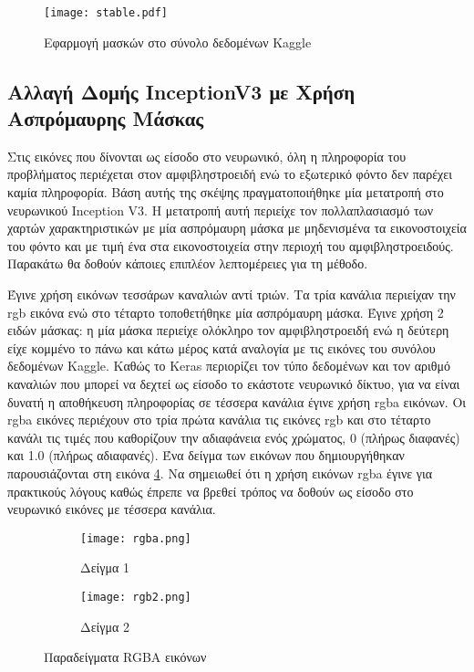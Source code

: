 \begin{figure}[!h]
    \centering
      \texttt{[image: stable.pdf]} \caption{Εφαρμογή μασκών στο σύνολο δεδομένων Kaggle}
\label{figure:stable}  
\end{figure}

\subsection{Αλλαγή Δομής InceptionV3 με Χρήση Ασπρόμαυρης Μάσκας}
\label{subsec:5.4.5}

Στις εικόνες που δίνονται ως είσοδο στο νευρωνικό, όλη η πληροφορία του προβλήματος περιέχεται στον αμφιβληστροειδή ενώ το εξωτερικό φόντο δεν παρέχει καμία πληροφορία. Βάση αυτής της σκέψης πραγματοποιήθηκε μία μετατροπή στο νευρωνικού Inception V3. Η μετατροπή αυτή περιείχε  τον πολλαπλασιασμό των χαρτών χαρακτηριστικών με μία ασπρόμαυρη μάσκα με μηδενισμένα τα εικονοστοιχεία του φόντο και με τιμή ένα στα εικονοστοιχεία στην περιοχή του αμφιβληστροειδούς. Παρακάτω θα δοθούν κάποιες επιπλέον λεπτομέρειες για τη μέθοδο.

Έγινε χρήση εικόνων τεσσάρων καναλιών αντί τριών. Τα τρία  κανάλια περιείχαν την rgb εικόνα ενώ στο τέταρτο τοποθετήθηκε μία ασπρόμαυρη μάσκα. Έγινε χρήση 2 ειδών μάσκας: η μία μάσκα περιείχε ολόκληρο τον αμφιβληστροειδή ενώ η δεύτερη είχε κομμένο το πάνω και κάτω μέρος κατά αναλογία με τις εικόνες του συνόλου δεδομένων Kaggle.  Καθώς το Keras περιορίζει τον τύπο δεδομένων και τον αριθμό καναλιών που μπορεί να δεχτεί ως είσοδο το εκάστοτε νευρωνικό δίκτυο, για να είναι δυνατή η αποθήκευση πληροφορίας σε τέσσερα κανάλια έγινε χρήση rgba εικόνων. Οι  rgba εικόνες περιέχουν στο τρία πρώτα κανάλια τις εικόνες rgb και στο τέταρτο κανάλι τις τιμές που καθορίζουν την αδιαφάνεια ενός χρώματος, 0 (πλήρως διαφανές) και 1.0 (πλήρως αδιαφανές). Ένα δείγμα των εικόνων που δημιουργήθηκαν παρουσιάζονται στη εικόνα \ref{figure:rgba}. Να σημειωθεί ότι η χρήση εικόνων rgba έγινε για πρακτικούς λόγους καθώς έπρεπε να βρεθεί τρόπος να δοθούν ως είσοδο στο νευρωνικό εικόνες με τέσσερα κανάλια.

\begin{figure}[!h]
\centering
\begin{subfigure}{.5\textwidth}
  \centering
  \texttt{[image: rgba.png]}
  \caption{Δείγμα 1}
  \label{fig:rgba1}
\end{subfigure}
\qquad
\begin{subfigure}{.5\textwidth}
  \centering
  \texttt{[image: rgb2.png]}
  \caption{Δείγμα 2}
  \label{fig:rgba2}
\end{subfigure}
\caption{Παραδείγματα RGBA εικόνων}
\label{figure:rgba}
\end{figure}

